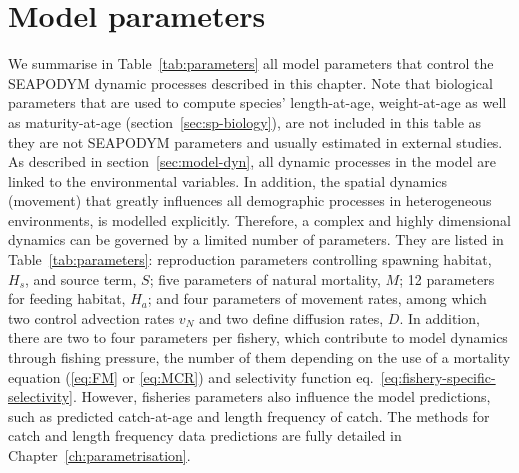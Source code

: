 \section{Model parameters}\label{sec:parameters}
We summarise in Table~\ref{tab:parameters} all model parameters that control the SEAPODYM dynamic processes described in this chapter. Note that biological parameters that are used to compute species' length-at-age, weight-at-age as well as maturity-at-age (section~\ref{sec:sp-biology}), are not included in this table as they are not SEAPODYM parameters and usually estimated in external studies. As described in section~\ref{sec:model-dyn}, all dynamic processes in the model are linked to the environmental variables. In addition, the spatial dynamics (movement) that greatly influences all demographic processes in heterogeneous environments, is modelled explicitly. Therefore, a complex and highly dimensional dynamics can be governed by a limited number of parameters. They are listed in Table~\ref{tab:parameters}: reproduction parameters controlling spawning habitat, $H_s$, and source term, $S$; five parameters of natural mortality, $M$; 12 parameters for feeding habitat, $H_a$; and four parameters of movement rates, among which two control advection rates $v_N$ and two define diffusion rates, $D$. In addition, there are two to four parameters per fishery, which contribute to model dynamics through fishing pressure, the number of them depending on the use of a mortality equation (\ref{eq:FM} or \ref{eq:MCR}) and selectivity function eq.~\ref{eq:fishery-specific-selectivity}. However, fisheries parameters also influence  the model predictions, such as predicted catch-at-age and length frequency of catch. The methods for catch and length frequency data predictions are fully detailed in Chapter~\ref{ch:parametrisation}. 




